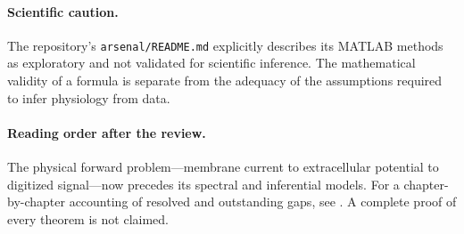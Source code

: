 \paragraph{Scientific caution.}
The repository's \texttt{arsenal/README.md} explicitly describes its
MATLAB methods as exploratory and not validated for scientific inference.
The mathematical validity of a formula is separate from the adequacy
of the assumptions required to infer physiology from data.

\paragraph{Reading order after the review.}
The physical forward problem---membrane current to extracellular potential
to digitized signal---now precedes its spectral and inferential models.
For a chapter-by-chapter accounting of resolved and outstanding gaps, see
\texttt{}.
A complete proof of every theorem is not claimed.
